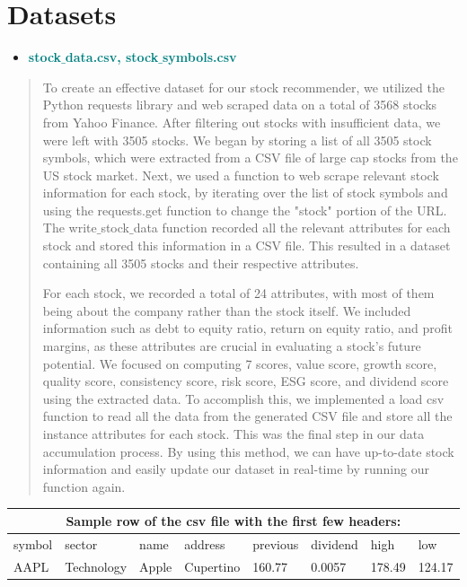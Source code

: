 \documentclass[fontsize=12pt]{article}
\begin{document}
\section*{Datasets}

\begin{itemize}
\item
  
  \textbf{\textcolor{teal}{stock$\_$data.csv, stock$\_$symbols.csv}}
  
\end{itemize}

\begin{quote}
\noindent To create an effective dataset for our stock recommender, we utilized the Python requests library and web scraped data on a total of 3568 stocks from Yahoo Finance. After filtering out stocks with insufficient data, we were left with 3505 stocks. We began by storing a list of all 3505 stock symbols, which were extracted from a CSV file of large cap stocks from the US stock market. Next, we used a function to web scrape relevant stock information for each stock, by iterating over the list of stock symbols and using the requests.get function to change the "stock" portion of the URL. The write$\_$stock$\_$data function recorded all the relevant attributes for each stock and stored this information in a CSV file. This resulted in a dataset containing all 3505 stocks and their respective attributes.

For each stock, we recorded a total of 24 attributes, with most of them being about the company rather than the stock itself. We included information such as debt to equity ratio, return on equity ratio, and profit margins, as these attributes are crucial in evaluating a stock's future potential. We focused on computing 7 scores, value score, growth score, quality score, consistency score, risk score, ESG score, and dividend score using the extracted data. To accomplish this, we implemented a load csv function to read all the data from the generated CSV file and store all the instance attributes for each stock. This was the final step in our data accumulation process. By using this method, we can have up-to-date stock information and easily update our dataset in real-time by running our function again.
\end{quote}
\begin{center}
\begin{tabular}{|p{1.5cm}|p{1.5cm}|p{1.5cm}|p{1.5cm}|p{1.5cm}|p{1.5cm}|p{1.5cm}|p{1.5cm}|}
 \hline
 \multicolumn{8}{|c|}{Sample row of the csv file with the first few headers:} \\
 \hline
symbol & sector & name & address & previous & dividend & high & low\\
 \hline
AAPL & Technology & Apple & Cupertino & 160.77 & 0.0057 & 178.49 & 124.17\\
 \hline
\end{tabular}
\end{center}
\end{document}
